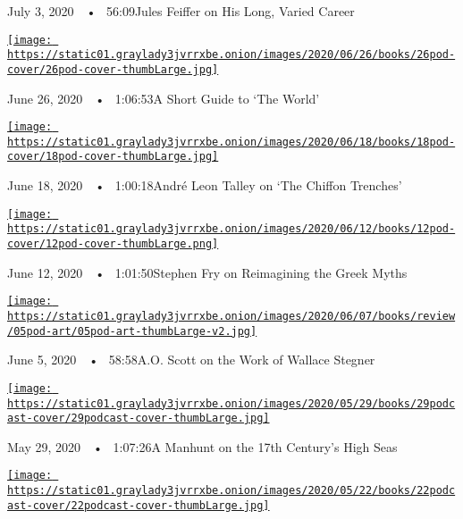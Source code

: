 July 3, 2020~~•~ 56:09Jules Feiffer on His Long, Varied Career

\href{https://www.nytimes3xbfgragh.onion/2020/06/26/books/review/podcast-richard-haass-world-brief-introduction.html?action=click\&module=audio-series-bar\&region=header\&pgtype=Article}{\texttt{[image: https://static01.graylady3jvrrxbe.onion/images/2020/06/26/books/26pod-cover/26pod-cover-thumbLarge.jpg]}}

June 26, 2020~~•~ 1:06:53A Short Guide to `The World'

\href{https://www.nytimes3xbfgragh.onion/2020/06/18/books/review/andre-leon-talley-chiffon-trenches-claudia-rankine-jericho-brown-megha-majumdar-burning.html?action=click\&module=audio-series-bar\&region=header\&pgtype=Article}{\texttt{[image: https://static01.graylady3jvrrxbe.onion/images/2020/06/18/books/18pod-cover/18pod-cover-thumbLarge.jpg]}}

June 18, 2020~~•~ 1:00:18André Leon Talley on `The Chiffon Trenches'

\href{https://www.nytimes3xbfgragh.onion/2020/06/12/books/review/podcast-stephen-fry-heroes-greek-myths.html?action=click\&module=audio-series-bar\&region=header\&pgtype=Article}{\texttt{[image: https://static01.graylady3jvrrxbe.onion/images/2020/06/12/books/12pod-cover/12pod-cover-thumbLarge.png]}}

June 12, 2020~~•~ 1:01:50Stephen Fry on Reimagining the Greek Myths

\href{https://www.nytimes3xbfgragh.onion/2020/06/05/books/review/podcast-a-o-scott-wallace-stegner-sunny-days-david-kamp.html?action=click\&module=audio-series-bar\&region=header\&pgtype=Article}{\texttt{[image: https://static01.graylady3jvrrxbe.onion/images/2020/06/07/books/review/05pod-art/05pod-art-thumbLarge-v2.jpg]}}

June 5, 2020~~•~ 58:58A.O. Scott on the Work of Wallace Stegner

\href{https://www.nytimes3xbfgragh.onion/2020/05/29/books/review/podcast-enemy-of-all-mankind-piracy-steven-johnson-stephen-king-gilbert-cruz.html?action=click\&module=audio-series-bar\&region=header\&pgtype=Article}{\texttt{[image: https://static01.graylady3jvrrxbe.onion/images/2020/05/29/books/29podcast-cover/29podcast-cover-thumbLarge.jpg]}}

May 29, 2020~~•~ 1:07:26A Manhunt on the 17th Century's High Seas

\href{https://www.nytimes3xbfgragh.onion/2020/05/22/books/review/podcast-one-mighty-irresistible-tide-immigration-jia-lynn-yang-simplify-life-judith-newman.html?action=click\&module=audio-series-bar\&region=header\&pgtype=Article}{\texttt{[image: https://static01.graylady3jvrrxbe.onion/images/2020/05/22/books/22podcast-cover/22podcast-cover-thumbLarge.jpg]}}

